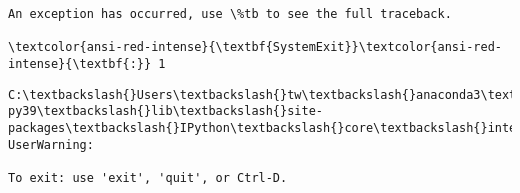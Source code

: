\documentclass[11pt]{article}
\makeatletter
\newcommand{\boxspacing}{\kern\kvtcb@left@rule\kern\kvtcb@boxsep}
\newcommand{\prompt}[4]{
        {\ttfamily\llap{{\color{#2}[#3]:\hspace{3pt}#4}}\vspace{-\baselineskip}}
    }
\makeatother
\begin{document}
    \begin{Verbatim}[commandchars=\\\{\}, frame=single, framerule=2mm, rulecolor=\color{outerrorbackground}]
An exception has occurred, use \%tb to see the full traceback.

\textcolor{ansi-red-intense}{\textbf{SystemExit}}\textcolor{ansi-red-intense}{\textbf{:}} 1

    \end{Verbatim}

    \begin{Verbatim}[commandchars=\\\{\}]
C:\textbackslash{}Users\textbackslash{}tw\textbackslash{}anaconda3\textbackslash{}envs\textbackslash{}test02-py39\textbackslash{}lib\textbackslash{}site-
packages\textbackslash{}IPython\textbackslash{}core\textbackslash{}interactiveshell.py:3405: UserWarning:

To exit: use 'exit', 'quit', or Ctrl-D.

    \end{Verbatim}

    \begin{tcolorbox}[breakable, size=fbox, boxrule=1pt, pad at break*=1mm,colback=cellbackground, colframe=cellborder]
\prompt{In}{incolor}{ }{\boxspacing}
\begin{Verbatim}[commandchars=\\\{\}]

\end{Verbatim}
\end{tcolorbox}


    
    
    
\end{document}
